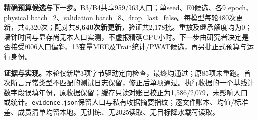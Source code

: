 \documentclass[UTF8,10pt]{ctexart}
\begin{document}
\textbf{精确预算候选与下一步。}B3/B4共享959/963人口；单seed、E0候选、各9 epoch、physical batch=2、validation batch=8、drop\_last=false。每模型每轮480次更新，共4,320次；配对共\textbf{8,640次新更新}，验证共2,178批。重放及继承额度均为0；墙钟时间与显存尚无本人口实测，不虚报精确GPU小时。下一步由研究者决定是否接受f006人口偏斜、13变量MEE及Train统计/PWAT候选，再另批正式预算与运行身份。

\textbf{证据与实现。}本轮仅新增3项字节驱动定向检查，最终均通过；原85项未重跑。首次断言异常类型不匹配的测试日志保留，修正后单项通过。执行收据的一个基线计数字段误填年份，原收据保留；缓存只读对账已校正为1,586/2,079，未影响人口或统计。\texttt{evidence.json}保留人口与私有收据摘要指纹；逐文件账本、均值/标准差、成员清单均留本地。无训练、无2025读取、无目标降水载荷读取。
\end{document}
